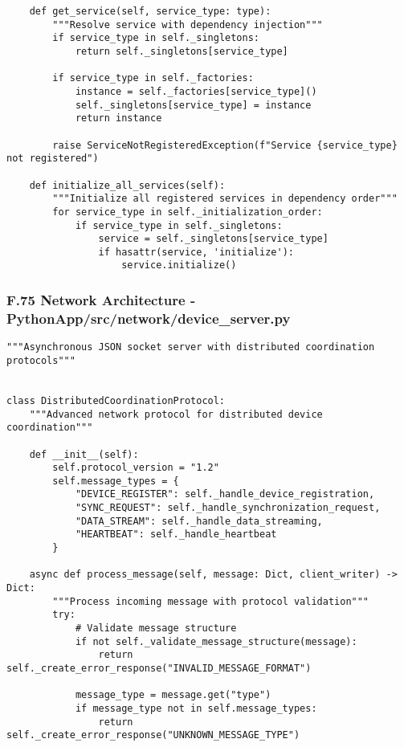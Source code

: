 \documentclass[12pt,a4paper]{report}
\begin{document}
{{\begin{verbatim}
    def get_service(self, service_type: type):
        """Resolve service with dependency injection"""
        if service_type in self._singletons:
            return self._singletons[service_type]

        if service_type in self._factories:
            instance = self._factories[service_type]()
            self._singletons[service_type] = instance
            return instance

        raise ServiceNotRegisteredException(f"Service {service_type} not registered")

    def initialize_all_services(self):
        """Initialize all registered services in dependency order"""
        for service_type in self._initialization_order:
            if service_type in self._singletons:
                service = self._singletons[service_type]
                if hasattr(service, 'initialize'):
                    service.initialize()
\end{verbatim}

\subsubsection{F.75 Network Architecture - PythonApp/src/network/device_server.py}

\begin{verbatim}
"""Asynchronous JSON socket server with distributed coordination protocols"""


class DistributedCoordinationProtocol:
    """Advanced network protocol for distributed device coordination"""

    def __init__(self):
        self.protocol_version = "1.2"
        self.message_types = {
            "DEVICE_REGISTER": self._handle_device_registration,
            "SYNC_REQUEST": self._handle_synchronization_request,
            "DATA_STREAM": self._handle_data_streaming,
            "HEARTBEAT": self._handle_heartbeat
        }

    async def process_message(self, message: Dict, client_writer) -> Dict:
        """Process incoming message with protocol validation"""
        try:
            # Validate message structure
            if not self._validate_message_structure(message):
                return self._create_error_response("INVALID_MESSAGE_FORMAT")

            message_type = message.get("type")
            if message_type not in self.message_types:
                return self._create_error_response("UNKNOWN_MESSAGE_TYPE")


\end{verbatim}}}
\end{document}
